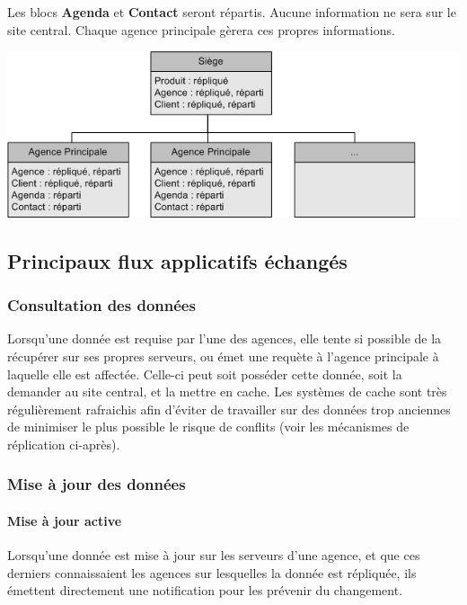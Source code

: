 Les blocs \textbf{Agenda} et \textbf{Contact} seront répartis. Aucune information ne sera sur le site central. Chaque agence principale gèrera ces propres informations.

\begin {center}
\includegraphics[width=\textwidth]{repartition_bloc.png}
\end {center}

\subsection{Principaux flux applicatifs échangés}

\subsubsection{Consultation des données}

Lorsqu'une donnée est requise par l'une des agences, elle tente si possible de la récupérer sur ses
propres serveurs, ou émet une requète à l'agence principale à laquelle elle est affectée. Celle-ci
peut soit posséder cette donnée, soit la demander au site central, et la mettre en cache. Les systèmes
de cache sont très régulièrement rafraichis afin d'éviter de travailler sur des données trop anciennes
de minimiser le plus possible le risque de conflits (voir les mécanismes de réplication ci-après).

\subsubsection{Mise à jour des données}

\paragraph{Mise à jour active}

Lorsqu'une donnée est mise à jour sur les serveurs d'une agence, et que ces derniers connaissaient les
agences sur lesquelles la donnée est répliquée, ils émettent directement une notification pour les
prévenir du changement.

